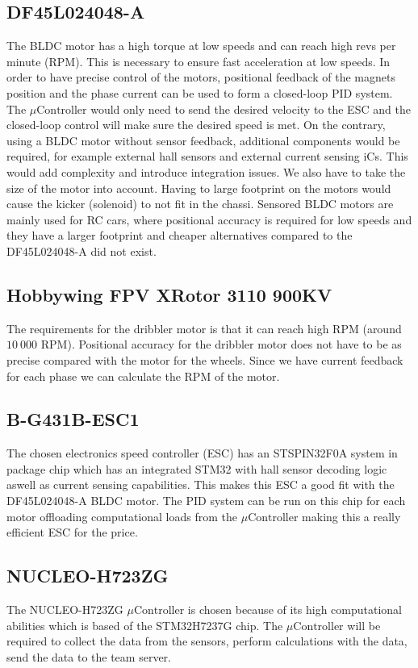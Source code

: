 \documentclass[a4paper,12pt]{article}
\begin{document}
\subsection*{DF45L024048-A}
The BLDC motor has a high torque at low speeds and can reach high revs per minute (RPM). This is necessary to ensure fast acceleration at low speeds. In order to have precise control of the motors, positional feedback of the magnets position and the phase current can be used to form a closed-loop PID system. The $\mu\text{Controller}$ would only need to send the desired velocity to the ESC and the closed-loop control will make sure the desired speed is met.
On the contrary, using a BLDC motor without sensor feedback, additional components would be required, for example external hall sensors and external current sensing iCs. This would add complexity and introduce integration issues.
We also have to take the size of the motor into account. Having to large footprint on the motors would cause the kicker (solenoid) to not fit in the chassi. Sensored BLDC motors are mainly used for RC cars, where positional accuracy is required for low speeds and they have a larger footprint and cheaper alternatives compared to the DF45L024048-A did not exist. 

\subsection*{Hobbywing FPV XRotor 3110 900KV}
The requirements for the dribbler motor is that it can reach high RPM (around $10\:000\text{ RPM}$). Positional accuracy for the dribbler motor does not have to be as precise compared with the motor for the wheels. Since we have current feedback for each phase we can calculate the RPM of the motor.

\subsection*{B-G431B-ESC1}
The chosen electronics speed controller (ESC) has an STSPIN32F0A system in package chip which has an integrated STM32 with hall sensor decoding logic aswell as current sensing capabilities. This makes this ESC a good fit with the DF45L024048-A BLDC motor. The PID system can be run on this chip for each motor offloading computational loads from the $\mu\text{Controller}$ making this a really efficient ESC for the price.

\subsection*{NUCLEO-H723ZG}
The NUCLEO-H723ZG $\mu\text{Controller}$ is chosen because of its high computational abilities which is based of the STM32H7237G chip. The $\mu\text{Controller}$ will be required to collect the data from the sensors, perform calculations with the data, send the data to the team server.
\end{document}

